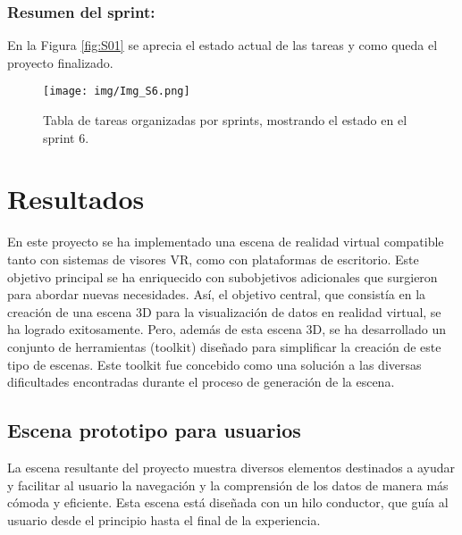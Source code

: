 \documentclass[a4paper, 12pt]{book}
\begin{document}
            \subsection{Resumen del sprint:}
            
            En la Figura \ref{fig:S01} se aprecia el estado actual de las tareas y como queda el proyecto finalizado.
            \begin{figure}[H]
                \centering
                \texttt{[image: img/Img\_S6.png]}
                \caption{\footnotesize Tabla de tareas organizadas por sprints, mostrando el estado en el sprint 6.}

                \label{fig:S51}
            \end{figure}     

\newpage


\cleardoublepage
\chapter{Resultados}
\label{chap:resultados}

En este proyecto se ha implementado una escena de realidad virtual compatible tanto con sistemas de visores VR, como con plataformas de escritorio. Este objetivo principal se ha enriquecido con subobjetivos adicionales que surgieron para abordar nuevas necesidades. Así, el objetivo central, que consistía en la creación de una escena 3D para la visualización de datos en realidad virtual, se ha logrado exitosamente. Pero, además de esta escena 3D, se ha desarrollado un conjunto de herramientas (toolkit) diseñado para simplificar la creación de este tipo de escenas. Este toolkit fue concebido como una solución a las diversas dificultades encontradas durante el proceso de generación de la escena.

\section {Escena prototipo para usuarios}

La escena resultante del proyecto muestra diversos elementos destinados a ayudar y facilitar al usuario la navegación y la comprensión de los datos de manera más cómoda y eficiente. Esta escena está diseñada con un hilo conductor, que guía al usuario desde el principio hasta el final de la experiencia.
\end{document}

